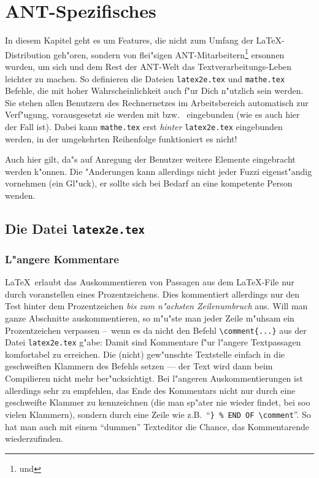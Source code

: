 \chapter{ANT-Spezifisches}\label{CPTbeisp} 
%
In diesem Kapitel geht es um Features, die nicht zum Umfang der
\LaTeX-Distribution geh"oren, sondern von flei"sigen
ANT-Mitarbeitern\footnote{ und
} ersonnen wurden, um sich und dem Rest der
ANT-Welt das Textverarbeitungs-Leben leichter zu machen. So definieren
die Dateien {\tt latex2e.tex} und {\tt mathe.tex} Befehle, die mit
hoher Wahrscheinlichkeit auch f"ur Dich n"utzlich sein werden. Sie
stehen allen Benutzern des Rechnernetzes im Arbeitsbereich automatisch
zur Verf"ugung, vorausgesetzt sie werden mit \verb++
bzw.\ \verb++ eingebunden (wie es auch hier der Fall
ist).  Dabei kann {\tt mathe.tex}  erst {\em hinter} {\tt latex2e.tex}
eingebunden werden, in der umgekehrten Reihenfolge funktioniert es
nicht!

Auch hier gilt, da"s auf Anregung der Benutzer weitere Elemente
eingebracht werden k"onnen. Die "Anderungen kann allerdings nicht jeder
Fuzzi eigenst"andig vornehmen (ein Gl"uck), er sollte sich bei Bedarf
an eine kompetente Person wenden.


\section{Die Datei {\tt latex2e.tex}} \label{SECbild}

\subsection{L"angere Kommentare}
%
\LaTeX\ erlaubt das Auskommentieren von Passagen aus dem \LaTeX-File
nur durch voranstellen eines Prozentzeichens. Dies kommentiert allerdings
nur den Test hinter dem Prozentzeichen {\em bis zum n"achsten Zeilenumbruch} aus.
Will man ganze Abschnitte auskommentieren, so m"u"ste man jeder Zeile
m"uhsam ein Prozentzeichen verpassen --~wenn es da nicht den Befehl
\verb+\comment{...}+ aus der Datei {\tt latex2e.tex} g"abe:
Damit sind Kommentare f"ur l"angere Textpassagen komfortabel zu
erreichen. Die (nicht) gew"unschte Textstelle einfach in die geschweiften 
Klammern des Befehls setzen --- der Text wird dann beim Compilieren nicht mehr
ber"ucksichtigt. Bei l"angeren Auskommentierungen ist allerdings sehr
zu empfehlen, das Ende des Kommentars nicht nur durch eine geschweifte Klammer
zu kennzeichnen (die man sp"ater nie wieder findet, bei soo vielen Klammern),
sondern durch eine Zeile wie z.B.\ ``\verb+} % END OF \comment+''. So hat man auch
mit einem ``dummen'' Texteditor die Chance, das Kommentarende wiederzufinden.

